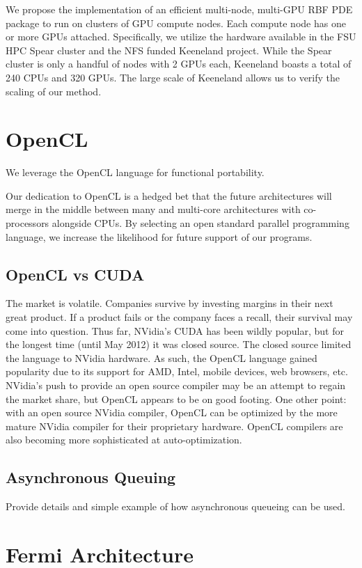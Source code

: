 
We propose the implementation of an efficient multi-node, multi-GPU RBF PDE package to run on clusters of GPU compute nodes. Each compute node has one or more GPUs attached. Specifically, we utilize the hardware available in the FSU HPC Spear cluster and the NFS funded Keeneland project. While the Spear cluster is only a handful of nodes with 2 GPUs each, Keeneland boasts a total of 240 CPUs and 320 GPUs. The large scale of Keeneland allows us to verify the scaling of our method. 

\section{OpenCL}
We leverage the OpenCL language for functional portability. 

Our dedication to OpenCL is a hedged bet that the future architectures will merge in the middle between many and multi-core architectures with co-processors alongside CPUs. By selecting an open standard parallel programming language, we increase the likelihood for future support of our programs. 

\subsection{OpenCL vs CUDA}
The market is volatile. Companies survive by investing margins in their next great product. If a product fails or the company faces a recall, their survival may come into question. Thus far, NVidia's CUDA has been wildly popular, but for the longest time (until May 2012) it was closed source. The closed source limited the language to NVidia hardware. As such, the OpenCL language gained popularity due to its support for AMD, Intel, mobile devices, web browsers, etc. NVidia's push to provide an open source compiler may be an attempt to regain the market share, but OpenCL appears to be on good footing. One other point: with an open source NVidia compiler, OpenCL can be optimized by the more mature NVidia compiler for their proprietary hardware. OpenCL compilers are also becoming more sophisticated at auto-optimization. 

\subsection{Asynchronous Queuing} 
Provide details and simple example of how asynchronous queueing can be used. 


\section{Fermi Architecture}

